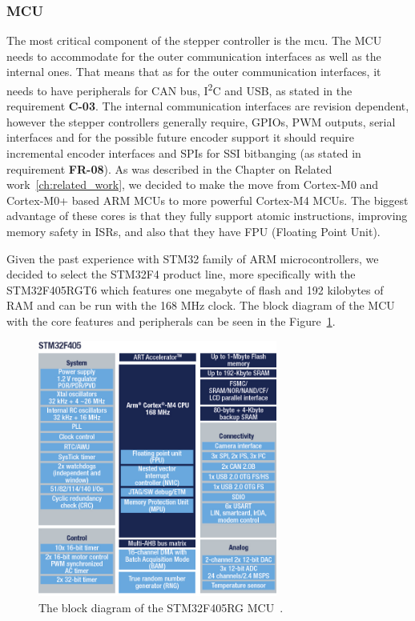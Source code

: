 \subsubsection{MCU}
\label{subsubsec:mcu}
The most critical component of the stepper controller is the \acs{mcu}.
The MCU needs to accommodate for the outer communication interfaces as well as the internal ones.
That means that as for the outer communication interfaces, it needs to have peripherals for CAN bus, I\textsuperscript{2}C and USB, as stated in the requirement \textbf{C-03}.
The internal communication interfaces are revision dependent, however the stepper controllers generally require, GPIOs, PWM outputs, serial interfaces and for the possible future encoder support it should require incremental encoder interfaces and SPIs for SSI bitbanging (as stated in requirement \textbf{FR-08}).
As was described in the Chapter on Related work~\ref{ch:related_work}, we decided to make the move from Cortex-M0 and Cortex-M0+ based ARM MCUs to more powerful Cortex-M4 MCUs.
The biggest advantage of these cores is that they fully support atomic instructions, improving memory safety in ISRs, and also that they have FPU (Floating Point Unit).

Given the past experience with STM32 family of ARM microcontrollers, we decided to select the STM32F4 product line, more specifically with the STM32F405RGT6 which features one megabyte of flash and 192 kilobytes of RAM and can be run with the 168 MHz clock\cite{stmicro_stm32f405rg_nodate}.
The block diagram of the MCU with the core features and peripherals can be seen in the Figure~\ref{fig:stm32f405_block_diagram}.

\begin{figure}[H]
    \centering
    \includegraphics[width=0.7\textwidth]{obrazky/stm32f405_block_diagram}
    \caption{The block diagram of the STM32F405RG MCU~\cite{stmicro_enbd_stm32f405_1mbjpg_nodate}.}
    \label{fig:stm32f405_block_diagram}
\end{figure}

